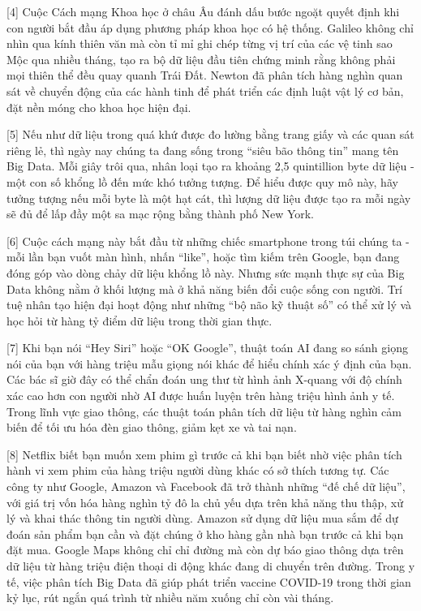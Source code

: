 \documentclass[12pt,a4paper,twoside]{article}
\newenvironment{readingpassage}[1][]{%
    \begin{tcolorbox}[enhanced, colback=grayLight, colframe=secondaryBlue,
        coltitle=textDark, fonttitle=\bfseries, title={#1},
        rounded corners, arc=3mm, boxrule=1pt,
        left=15pt, right=15pt, top=10pt, bottom=10pt,
        breakable, before skip=10pt, after skip=10pt, drop fuzzy shadow]
    \setstretch{1.3}
}{\end{tcolorbox}}
\begin{document}
\begin{readingpassage}[]
[4] Cuộc Cách mạng Khoa học ở châu Âu đánh dấu bước ngoặt quyết định khi con người bắt đầu áp dụng phương pháp khoa học có hệ thống. Galileo không chỉ nhìn qua kính thiên văn mà còn tỉ mỉ ghi chép từng vị trí của các vệ tinh sao Mộc qua nhiều tháng, tạo ra bộ dữ liệu đầu tiên chứng minh rằng không phải mọi thiên thể đều quay quanh Trái Đất. Newton đã phân tích hàng nghìn quan sát về chuyển động của các hành tinh để phát triển các định luật vật lý cơ bản, đặt nền móng cho khoa học hiện đại.

[5] Nếu như dữ liệu trong quá khứ được đo lường bằng trang giấy và các quan sát riêng lẻ, thì ngày nay chúng ta đang sống trong ``siêu bão thông tin'' mang tên Big Data. Mỗi giây trôi qua, nhân loại tạo ra khoảng 2,5 quintillion byte dữ liệu - một con số khổng lồ đến mức khó tưởng tượng. Để hiểu được quy mô này, hãy tưởng tượng nếu mỗi byte là một hạt cát, thì lượng dữ liệu được tạo ra mỗi ngày sẽ đủ để lấp đầy một sa mạc rộng bằng thành phố New York.

[6] Cuộc cách mạng này bắt đầu từ những chiếc smartphone trong túi chúng ta - mỗi lần bạn vuốt màn hình, nhấn ``like'', hoặc tìm kiếm trên Google, bạn đang đóng góp vào dòng chảy dữ liệu khổng lồ này. Nhưng sức mạnh thực sự của Big Data không nằm ở khối lượng mà ở khả năng biến đổi cuộc sống con người. Trí tuệ nhân tạo hiện đại hoạt động như những ``bộ não kỹ thuật số'' có thể xử lý và học hỏi từ hàng tỷ điểm dữ liệu trong thời gian thực.

[7] Khi bạn nói ``Hey Siri'' hoặc ``OK Google'', thuật toán AI đang so sánh giọng nói của bạn với hàng triệu mẫu giọng nói khác để hiểu chính xác ý định của bạn. Các bác sĩ giờ đây có thể chẩn đoán ung thư từ hình ảnh X-quang với độ chính xác cao hơn con người nhờ AI được huấn luyện trên hàng triệu hình ảnh y tế. Trong lĩnh vực giao thông, các thuật toán phân tích dữ liệu từ hàng nghìn cảm biến để tối ưu hóa đèn giao thông, giảm kẹt xe và tai nạn.

[8] Netflix biết bạn muốn xem phim gì trước cả khi bạn biết nhờ việc phân tích hành vi xem phim của hàng triệu người dùng khác có sở thích tương tự. Các công ty như Google, Amazon và Facebook đã trở thành những ``đế chế dữ liệu'', với giá trị vốn hóa hàng nghìn tỷ đô la chủ yếu dựa trên khả năng thu thập, xử lý và khai thác thông tin người dùng. Amazon sử dụng dữ liệu mua sắm để dự đoán sản phẩm bạn cần và đặt chúng ở kho hàng gần nhà bạn trước cả khi bạn đặt mua. Google Maps không chỉ chỉ đường mà còn dự báo giao thông dựa trên dữ liệu từ hàng triệu điện thoại di động khác đang di chuyển trên đường. Trong y tế, việc phân tích Big Data đã giúp phát triển vaccine COVID-19 trong thời gian kỷ lục, rút ngắn quá trình từ nhiều năm xuống chỉ còn vài tháng.


\end{readingpassage}
\end{document}
